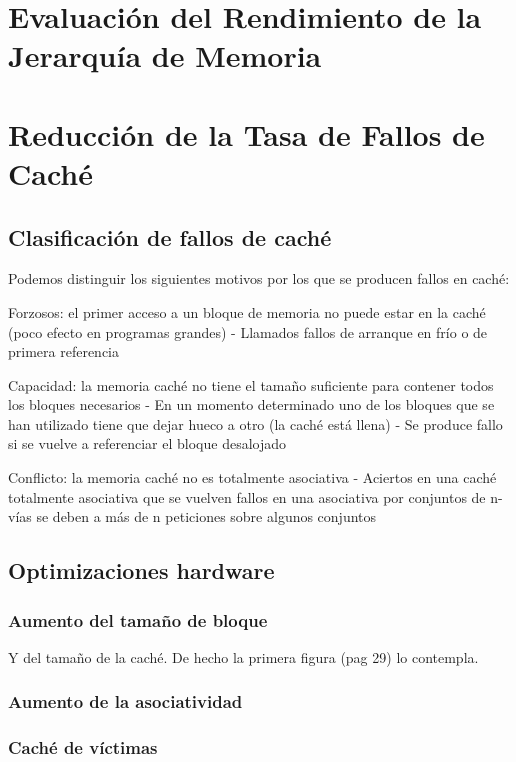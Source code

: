 \documentclass[12pt,onecolumn]{memoir}
\begin{document}
\section{Evaluación del Rendimiento de la Jerarquía de Memoria}

\section{Reducción de la Tasa de Fallos de Caché}

\subsection{Clasificación de fallos de caché}

Podemos distinguir los siguientes motivos por los que se 
producen fallos en caché:

Forzosos: el primer acceso a un bloque de memoria no puede 
estar en la caché (poco efecto en programas grandes)
- Llamados fallos de arranque en frío o de primera referencia

Capacidad: la memoria caché no tiene el tamaño suficiente para 
contener todos los bloques necesarios
- En un momento determinado uno de los bloques que se han 
utilizado tiene que dejar hueco a otro (la caché está llena)
- Se produce fallo si se vuelve a referenciar el bloque desalojado

Conflicto: la memoria caché no es totalmente asociativa 
- Aciertos en una caché totalmente asociativa que se vuelven 
fallos en una asociativa por conjuntos de 
n-vías se deben a más de n peticiones sobre algunos conjuntos

\subsection{Optimizaciones hardware}

\subsubsection{Aumento del tamaño de bloque}

Y del tamaño de la caché. De hecho la primera figura (pag 29) lo contempla.

\subsubsection{Aumento de la asociatividad}

\subsubsection{Caché de víctimas}
\end{document}
